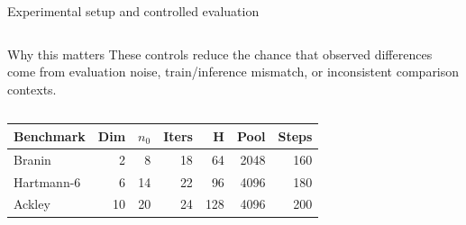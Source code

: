 \documentclass[aspectratio=169]{beamer}
\newcommand{\TinyCap}{\fontsize{8.0}{9}\selectfont}
\begin{document}
\begin{frame}{Experimental setup and controlled evaluation}
\begin{columns}[T,onlytextwidth]
\begin{minipage}[t][0.82\textheight]{\linewidth}
  \vfill

  \begin{cardG}{Why this matters}
  These controls reduce the chance that observed differences come from evaluation noise, train/inference mismatch, or inconsistent comparison contexts.
  \end{cardG}
\end{minipage}
\end{columns}

\vspace{0.35em}
\centering
{\TinyCap
\begin{tabular}{lrrrrrr}
\toprule
Benchmark & Dim & $n_0$ & Iters & H & Pool & Steps \\
\midrule
Branin & 2 & 8 & 18 & 64 & 2048 & 160 \\
Hartmann-6 & 6 & 14 & 22 & 96 & 4096 & 180 \\
Ackley & 10 & 20 & 24 & 128 & 4096 & 200 \\
\bottomrule
\end{tabular}
}
\end{frame}
\end{document}
